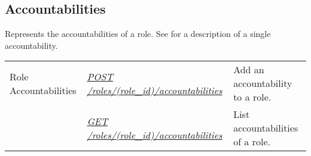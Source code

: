 \documentclass[letterpaper,10pt,english]{sphinxmanual}
\begin{document}
\subsection{Accountabilities}
\label{\detokenize{resources/role:accountabilities}}
Represents the accountabilities of a role. See {\hyperref[\detokenize{resources/accountability:accountability}]{}} for a description of a single accountability.

\noindent\begin{tabulary}{\linewidth}{|L|L|L|}
\hline
{}\relax &\relax &\relax \\
\hline
Role Accountabilities
&
{\hyperref[\detokenize{resources/role:post--roles-(role_id)-accountabilities}]{\emph{POST /roles/(role\_id)/accountabilities}}}
&
Add an accountability to a role.
\\
\hline&
{\hyperref[\detokenize{resources/role:get--roles-(role_id)-accountabilities}]{\emph{GET /roles/(role\_id)/accountabilities}}}
&
List accountabilities of a role.
\\
\hline\end{tabulary}


\begin{DUlineblock}{0em}
\item[] 
\end{DUlineblock}
\end{document}
